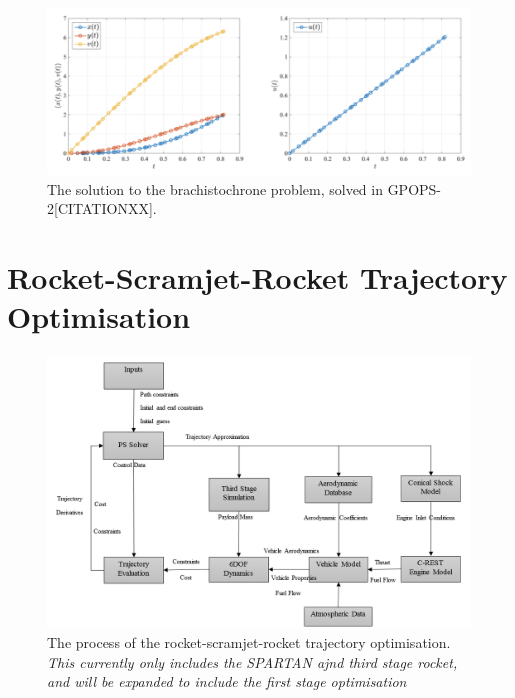 \begin{figure}[ht]
\centering
\includegraphics[width=0.9\linewidth]{figures/4_LODESTAR/Brachistochrone}
\caption{The solution to the brachistochrone problem, solved in GPOPS-2[CITATIONXX].}
\label{fig:Brachistochrone}
\end{figure}





\section{Rocket-Scramjet-Rocket Trajectory Optimisation}







\begin{landscape}%
	\begin{figure}[ht]
		\centering
		\includegraphics[width=0.9\linewidth]{"figures/4_LODESTAR/Ascent Flowchart"}
		\caption{The process of the rocket-scramjet-rocket trajectory optimisation. \textit{This currently only includes the SPARTAN ajnd third stage rocket, and will be expanded to include the first stage optimisation}}
		\label{fig:AscentFlowchart}
	\end{figure} 
\end{landscape}



